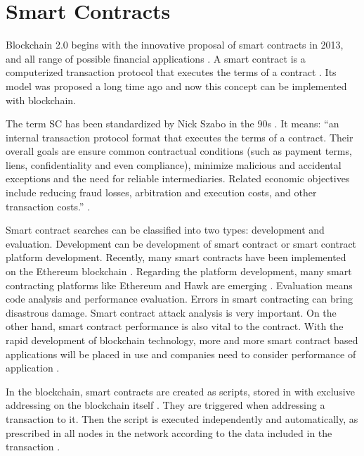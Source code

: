 \section{Smart Contracts}\label{sec:smartContracts}

Blockchain 2.0 begins with the innovative proposal of smart contracts in 2013, and all range of possible financial applications \cite{greve2018blockchain}. A smart contract is a computerized transaction protocol that executes the terms of a contract \cite{szabo1997idea}. Its model was proposed a long time ago and now this concept can be implemented with blockchain.

The term \acf{SC} has been standardized by Nick Szabo in the 90s \cite{greve2018blockchain}. It means: “an internal transaction protocol format that executes the terms of a contract. Their overall goals are ensure common contractual conditions (such as payment terms, liens, confidentiality and even compliance), minimize malicious and accidental exceptions and the need for reliable intermediaries. Related economic objectives include reducing fraud losses, arbitration and execution costs, and other transaction costs.” \cite{szabo1997idea}.

Smart contract searches can be classified into two types: development and evaluation. Development can be development of smart contract or smart contract platform development. Recently, many smart contracts have been implemented on the Ethereum blockchain \cite{wood2018secure}. Regarding the platform development, many smart contracting platforms like Ethereum \cite{wood2018secure} and Hawk \cite{kosbaa2016theblockchain} are emerging \cite{zheng2016blockchain}. Evaluation means code analysis and performance evaluation. Errors in smart contracting can bring disastrous damage. Smart contract attack analysis is very important. On the other hand, smart contract performance is also vital to the contract. With the rapid development of blockchain technology, more and more smart contract based applications will be placed in use and companies need to consider performance of application \cite{zheng2016blockchain}.

In the blockchain, smart contracts are created as scripts, stored in with exclusive addressing on the blockchain itself \cite{greve2018blockchain}. They are triggered when addressing a transaction to it. Then the script is executed independently and automatically, as prescribed in all nodes in the network according to the data included in the transaction \cite{christidis2016blockchains}.


